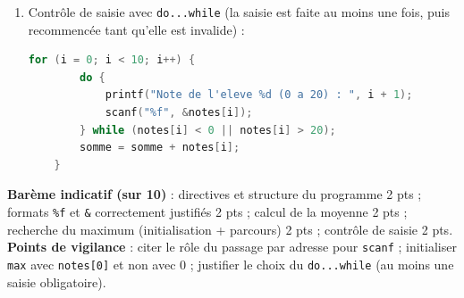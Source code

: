 \documentclass[11pt]{article}
\begin{document}
\begin{corrige}
\begin{enumerate}
\begin{lstlisting}[language=C]
    printf("Moyenne = %.2f\n", moyenne);
    printf("Meilleure note = %.2f\n", max);
    return 0;
}
\end{lstlisting}
\item Contrôle de saisie avec \texttt{do...while} (la saisie est faite au moins une fois, puis recommencée tant qu'elle est invalide) :
\begin{lstlisting}[language=C]
    for (i = 0; i < 10; i++) {
        do {
            printf("Note de l'eleve %d (0 a 20) : ", i + 1);
            scanf("%f", &notes[i]);
        } while (notes[i] < 0 || notes[i] > 20);
        somme = somme + notes[i];
    }
\end{lstlisting}
\end{enumerate}
\textbf{Barème indicatif (sur 10)} : directives et structure du programme 2 pts ; formats \texttt{\%f} et \texttt{\&} correctement justifiés 2 pts ; calcul de la moyenne 2 pts ; recherche du maximum (initialisation + parcours) 2 pts ; contrôle de saisie 2 pts.\\
\textbf{Points de vigilance} : citer le rôle du passage par adresse pour \texttt{scanf} ; initialiser \texttt{max} avec \texttt{notes[0]} et non avec 0 ; justifier le choix du \texttt{do...while} (au moins une saisie obligatoire).
\end{corrige}
\end{document}

